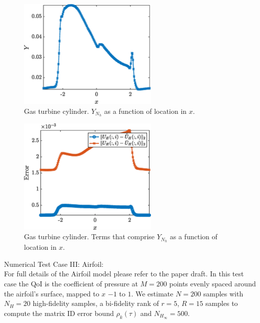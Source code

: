 \documentclass{report}
\begin{document}
% 
\begin{figure}[ht!]
\centering
\includegraphics[width =0.6\textwidth]{Figures/GT_cylinder_Y.eps}
\caption{Gas turbine cylinder. $Y_{N_h}$ as a function of location in $x$.} 
\label{fig:GT_cylinder_Y}
\end{figure}
%
% 
\begin{figure}[ht!]
\centering
\includegraphics[width =0.6\textwidth]{Figures/GT_cylinder_Y_ratio.eps}
\caption{Gas turbine cylinder. Terms that comprise $Y_{N_h}$ as a function of location in $x$.} 
\label{fig:GT_cylinder_Y_ratio}
\end{figure}
%


Numerical Test Case III: Airfoil: \\

For full details of the Airfoil model please refer to the paper draft. In this test case the QoI is the coefficient of pressure at $M=200$ points evenly spaced around the airfoil's surface, mapped to $x$ $-1$ to $1$. We estimate $N=200$ samples with $N_H = 20$ high-fidelity samples, a bi-fidelity rank of $r=5$, $R=15$ samples to compute the matrix ID error bound $\rho_k(\tau)$ and $N_{H_\infty}=500$. 
\end{document}

